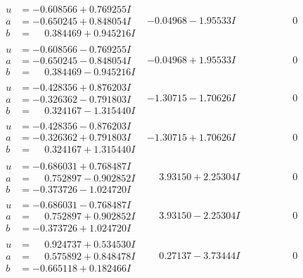 \documentclass[1p]{elsarticle_modified}
\theoremstyle{definition}
\begin{document}
$$\begin{array}{c|c|c}
\begin{aligned}
u &= -0.608566 + 0.769255 I \\
a &= -0.650245 + 0.848054 I \\
b &= \phantom{-}0.384469 + 0.945216 I\end{aligned}
 & -0.04968 - 1.95533 I & \phantom{-0.000000 } 0 \\ \hline\begin{aligned}
u &= -0.608566 - 0.769255 I \\
a &= -0.650245 - 0.848054 I \\
b &= \phantom{-}0.384469 - 0.945216 I\end{aligned}
 & -0.04968 + 1.95533 I & \phantom{-0.000000 } 0 \\ \hline\begin{aligned}
u &= -0.428356 + 0.876203 I \\
a &= -0.326362 - 0.791803 I \\
b &= \phantom{-}0.324167 - 1.315440 I\end{aligned}
 & -1.30715 - 1.70626 I & \phantom{-0.000000 } 0 \\ \hline\begin{aligned}
u &= -0.428356 - 0.876203 I \\
a &= -0.326362 + 0.791803 I \\
b &= \phantom{-}0.324167 + 1.315440 I\end{aligned}
 & -1.30715 + 1.70626 I & \phantom{-0.000000 } 0 \\ \hline\begin{aligned}
u &= -0.686031 + 0.768487 I \\
a &= \phantom{-}0.752897 - 0.902852 I \\
b &= -0.373726 - 1.024720 I\end{aligned}
 & \phantom{-}3.93150 + 2.25304 I & \phantom{-0.000000 } 0 \\ \hline\begin{aligned}
u &= -0.686031 - 0.768487 I \\
a &= \phantom{-}0.752897 + 0.902852 I \\
b &= -0.373726 + 1.024720 I\end{aligned}
 & \phantom{-}3.93150 - 2.25304 I & \phantom{-0.000000 } 0 \\ \hline\begin{aligned}
u &= \phantom{-}0.924737 + 0.534530 I \\
a &= \phantom{-}0.575892 + 0.848478 I \\
b &= -0.665118 + 0.182466 I\end{aligned}
 & \phantom{-}0.27137 - 3.73444 I & \phantom{-0.000000 } 0 \\ \hline\begin{aligned}

\end{aligned}
\end{array}$$
\end{document}

